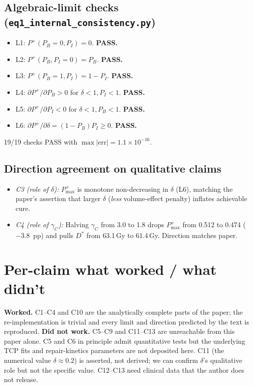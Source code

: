 \documentclass[11pt]{article}
\begin{document}
\subsection{Algebraic-limit checks (\texttt{eq1\_internal\_consistency.py})}
\begin{itemize}
  \item L1: $P^{+}(P_B=0,P_I) = 0$. \textbf{PASS.}
  \item L2: $P^{+}(P_B,P_I=0) = P_B$. \textbf{PASS.}
  \item L3: $P^{+}(P_B=1,P_I) = 1 - P_I$. \textbf{PASS.}
  \item L4: $\partial P^{+}/\partial P_B > 0$ for $\delta<1, P_I<1$. \textbf{PASS.}
  \item L5: $\partial P^{+}/\partial P_I < 0$ for $\delta<1, P_B<1$. \textbf{PASS.}
  \item L6: $\partial P^{+}/\partial \delta = (1-P_B)P_I \ge 0$. \textbf{PASS.}
\end{itemize}
19/19 checks PASS with $\max|\text{err}|\!=\!1.1\!\times\!10^{-16}$.

\subsection{Direction agreement on qualitative claims}
\begin{itemize}
\item \emph{C3 (role of $\delta$):} $P^{+}_{\max}$ is monotone non-decreasing
      in $\delta$ (L6), matching the paper's assertion that larger $\delta$
      (\emph{less} volume-effect penalty) inflates achievable cure.
\item \emph{C4 (role of $\gamma_C$):} Halving $\gamma_C$ from 3.0 to 1.8
      drops $P^{+}_{\max}$ from 0.512 to 0.474 ($-3.8$~pp) and pulls
      $D^{*}$ from 63.1\,Gy to 61.4\,Gy. Direction matches paper.
\end{itemize}

\section{Per-claim what worked / what didn't}
\textbf{Worked.} C1--C4 and C10 are the analytically complete parts of
the paper; the re-implementation is trivial and every limit and direction
predicted by the text is reproduced.
\textbf{Did not work.} C5--C9 and C11--C13 are unreachable from this
paper alone. C5 and C6 in principle admit quantitative tests but the
underlying TCP fits and repair-kinetics parameters are not deposited
here. C11 (the numerical value $\delta\approx 0.2$) is asserted, not
derived; we can confirm $\delta$'s qualitative role but not the specific
value. C12--C13 need clinical data that the author does not release.
\end{document}
